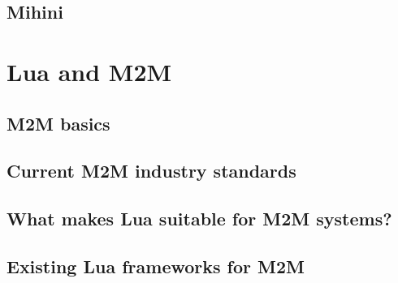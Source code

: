 \subsection{Mihini}

\section{Lua and M2M}
\label{ch:lua_m2m}

\subsection{M2M basics}
\label{sec:m2m_basics}

\subsection{Current M2M industry standards}
\label{sec:m2m_industry_standards}

\subsection{What makes Lua suitable for M2M systems?}

\subsection{Existing Lua frameworks for M2M}
\label{sec:existing_frameworks}